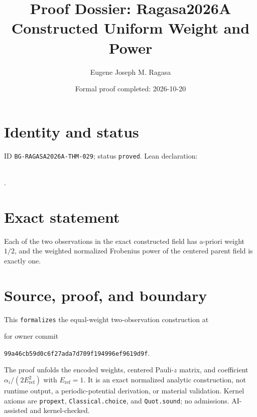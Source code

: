 \documentclass[11pt]{article}
\title{Proof Dossier: Ragasa2026A Constructed Uniform Weight and Power}\author{Eugene Joseph M. Ragasa}\date{Formal proof completed: 2026-10-20}
\begin{document}
\maketitle
\section{Identity and status}
ID \texttt{BG-RAGASA2026A-THM-029}; status \texttt{proved}. Lean declaration:
\par{}\\
{\tiny{}}.
\section{Exact statement}
Each of the two observations in the exact constructed field has a-priori weight $1/2$,
and the weighted normalized Frobenius power of the centered parent field is exactly one.
\section{Source, proof, and boundary}
This \texttt{formalizes} the equal-weight two-observation construction at
\begin{center}\small{}\end{center}
for owner commit
\begin{center}\small\texttt{99a46cb59d0c6f27ada7d709f194996ef9619d9f}.\end{center}
The proof unfolds the encoded weights,
centered Pauli-$z$ matrix, and coefficient $\alpha_i/(2E_{\mathrm{ref}}^2)$ with
$E_{\mathrm{ref}}=1$. It is an exact normalized analytic construction, not runtime output,
a periodic-potential derivation, or material validation. Kernel axioms are
\texttt{propext}, \texttt{Classical.choice}, and \texttt{Quot.sound}; no admissions.
AI-assisted and kernel-checked.
\end{document}
